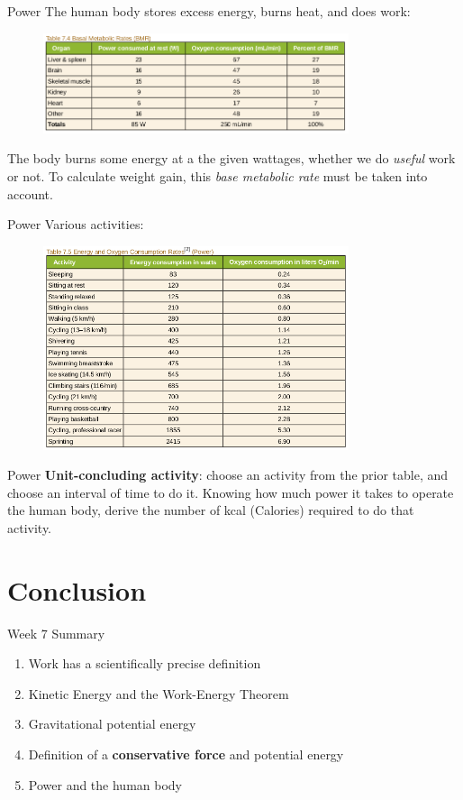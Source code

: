 \documentclass{beamer}
\begin{document}
\begin{frame}{Power}
The human body stores excess energy, burns heat, and does work:
\begin{figure}
\centering
\includegraphics[width=0.8\textwidth]{figures/body2.png}
\end{figure}
The body burns some energy at a the given wattages, whether we do \textit{useful} work or not.  To calculate weight gain, this \textit{base metabolic rate} must be taken into account.
\end{frame}

\begin{frame}{Power}
Various activities:
\begin{figure}
\centering
\includegraphics[width=0.8\textwidth]{figures/body3.png}
\end{figure}
\end{frame}

\begin{frame}{Power}
\textbf{Unit-concluding activity}: choose an activity from the prior table, and choose an interval of time to do it.  Knowing how much power it takes to operate the human body, derive the number of kcal (Calories) required to do that activity.
\end{frame}

\section{Conclusion}

\begin{frame}{Week 7 Summary}
\begin{enumerate}
\item \alert{Work} has a scientifically precise definition
\item Kinetic Energy and the \alert{Work-Energy Theorem}
\item Gravitational potential energy
\item Definition of a \textbf{conservative force} and potential energy
\item Power and the human body
\end{enumerate}
\end{frame}
\end{document}

